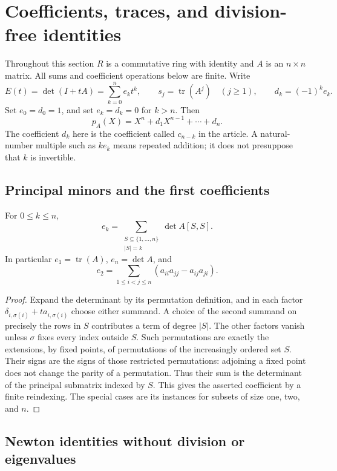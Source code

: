 \section{Coefficients, traces, and division-free identities}
\label{sec:trace}

Throughout this section $R$ is a commutative ring with identity and $A$ is an
$n\times n$ matrix.  All sums and coefficient operations below are finite.
Write
\[
 E(t)=\det(I+tA)=\sum_{k=0}^n e_k t^k,
 \qquad s_j=\operatorname{tr}(A^j)\quad(j\geq1),
 \qquad d_k=(-1)^k e_k.
\]
Set $e_0=d_0=1$, and set $e_k=d_k=0$ for $k>n$.  Then
\[
 p_A(X)=X^n+d_1X^{n-1}+\cdots+d_n.
\]
The coefficient $d_k$ here is the coefficient called $c_{n-k}$ in the
article.  A natural-number multiple such as $k e_k$ means repeated addition;
it does not presuppose that $k$ is invertible.

\subsection{Principal minors and the first coefficients}

\begin{proposition}
\label{prop:trace-principal}
For $0\leq k\leq n$,
\[
 e_k=\sum_{\substack{S\subseteq\{1,\ldots,n\}\\ |S|=k}}
       \det A[S,S].
\]
In particular $e_1=\operatorname{tr}(A)$, $e_n=\det A$, and
\[
 e_2=\sum_{1\leq i<j\leq n}
       (a_{ii}a_{jj}-a_{ij}a_{ji}).
\]
\end{proposition}
\begin{proof}
Expand the determinant by its permutation definition, and in each factor
$\delta_{i,\sigma(i)}+t a_{i,\sigma(i)}$ choose either summand.  A choice of
the second summand on precisely the rows in $S$ contributes a term of degree
$|S|$.  The other factors vanish unless $\sigma$ fixes every index outside
$S$.  Such permutations are exactly the extensions, by fixed points, of
permutations of the increasingly ordered set $S$.  Their signs are the
signs of those restricted permutations: adjoining a fixed point does not
change the parity of a permutation.  Thus their sum is the determinant of
the principal submatrix indexed by $S$.  This gives the asserted coefficient
by a finite reindexing.  The special cases are its instances for subsets of
size one, two, and $n$.
\end{proof}

\subsection{Newton identities without division or eigenvalues}

